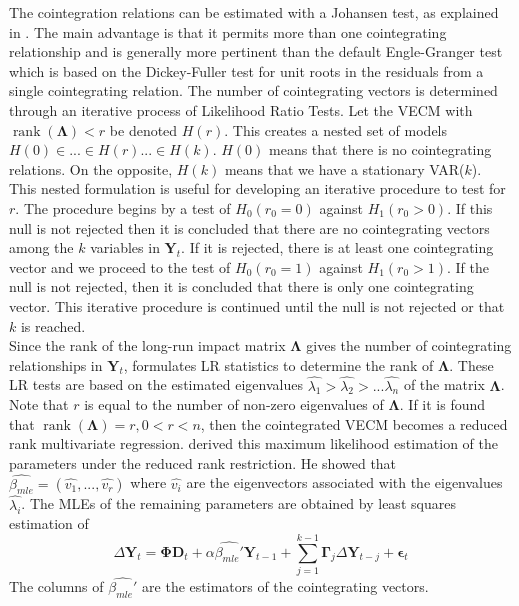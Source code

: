\documentclass[11pt,a4,twosided,singlespacing,titlepagenumber=on]{scrreprt}
\numberwithin{equation}{chapter} %
\theoremstyle{remark}
\DeclareMathOperator{\rank}{rank}
\newcommand{\matr}[1]{\mathbf{#1}}
\begin{document}
The cointegration relations can be estimated with a Johansen test, as explained in \cite{johansen1988}. The main advantage is that it permits more than one cointegrating relationship and is generally more pertinent than the default Engle-Granger test which is based on the Dickey-Fuller test for unit roots in the residuals from a single cointegrating relation. The number of cointegrating vectors is determined through an iterative process of Likelihood Ratio Tests. Let the VECM with $\rank\left(\matr{\Lambda}\right)<r$ be denoted $H(r)$. This creates a nested set of models $H(0) \in ... \in H(r) ... \in H(k)$. $H(0)$ means that there is no cointegrating relations. On the opposite, $H(k)$ means that we have a stationary VAR($k$). This nested formulation is useful for developing an iterative procedure to test for $r$. The procedure begins by a test of $H_0(r_0 = 0)$ against $H_1(r_0 > 0)$. If this null is not rejected then it is concluded that there are no cointegrating vectors among the $k$ variables in $\matr{Y}_t$. If it is rejected, there is at least one cointegrating vector and we proceed to the test of $H_0(r_0 = 1)$ against $H_1(r_0 > 1)$. If the null is not rejected, then it is concluded that there is only one cointegrating vector. This iterative procedure is continued until the null is not rejected or that $k$ is reached. \\


Since the rank of the long-run impact matrix $\matr{\Lambda}$ gives the number of cointegrating relationships in $\matr{Y}_t$, \cite{johansen1988} formulates LR statistics to determine the rank of $\matr{\Lambda}$. These LR tests are based on the estimated eigenvalues $\hat{\lambda_1} > \hat{\lambda_2} > ... \hat{\lambda_n}$ of the matrix $\matr{\Lambda}$. Note that $r$ is equal to the number of non-zero eigenvalues of $\matr{\Lambda}$. If it is found that $\rank\left(\matr{\Lambda}\right) = r, 0 < r < n$, then the cointegrated VECM becomes a reduced rank multivariate regression. \cite{johansen1988} derived this maximum likelihood estimation of the parameters under the reduced rank restriction. He showed that $\hat{\beta_{mle}} = (\hat{v_1},...,\hat{v_r})$ where $\hat{v_i}$ are the eigenvectors associated with the eigenvalues $\hat{\lambda_i}$. The MLEs of the remaining parameters are obtained by least squares estimation of
\begin{equation}
\Delta \matr{Y}_t = \matr{\Phi} \matr{D}_t + \alpha \hat{\beta_{mle}'} \matr{Y}_{t-1} + \sum_{j=1}^{k-1} \matr{\Gamma}_j \Delta \matr{Y}_{t-j} + \matr{\epsilon}_t
\end{equation}
The columns of $\hat{\beta_{mle}'}$ are the estimators of the cointegrating vectors. \\
\end{document}
